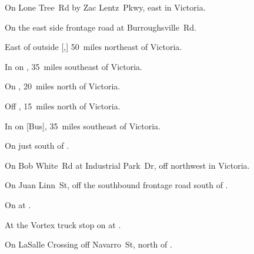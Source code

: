
\begin{LocationList}

On Lone Tree~Rd by  Zac Lentz~Pkwy, east in Victoria.

On the east side  frontage road at Burroughsville~Rd.

East of  outside [,] 50~miles northeast of Victoria.

In  on , 35~miles southeast of Victoria.

On , 20~miles north of Victoria.

Off , 15~miles north of Victoria.

In  on [Bus], 35~miles southeast of Victoria.

On  just south of .

On Bob White~Rd at Industrial Park~Dr, off  northwest in Victoria.

\Location{\TruckService \Service}
On Juan Linn~St, off the southbound  frontage road south of .

\Location{\TruckStop \Gas \Rest \Weigh}
On  at .

At the Vortex truck stop on  at .

On LaSalle Crossing off  Navarro~St, north of .

\end{LocationList}
